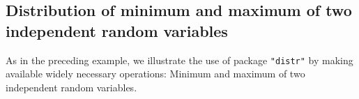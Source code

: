 \documentclass[11pt]{article}
\begin{document}
\subsection{Distribution of minimum and maximum of two independent random variables}\label{minmaxex}
\begin{small}
As in the preceding example, we illustrate the use of package {\tt "distr"} by making available
widely necessary operations: Minimum and maximum of two independent random variables.
\end{small}
\end{document}
